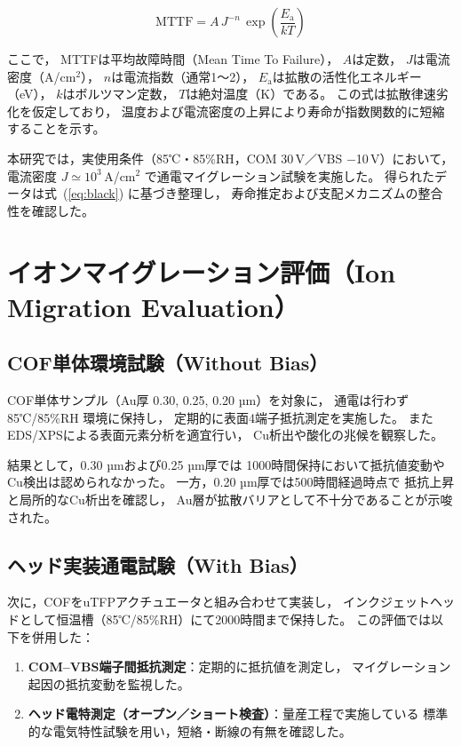 \documentclass[conference]{IEEEtran}
\begin{document}
\begin{equation}
  \mathrm{MTTF} = A \, J^{-n} \, \exp\!\left(\frac{E_\mathrm{a}}{kT}\right)
  \label{eq:black}
\end{equation}

ここで，
MTTFは平均故障時間（Mean Time To Failure），
$A$は定数，
$J$は電流密度（A/cm$^2$），
$n$は電流指数（通常1～2），
$E_\mathrm{a}$は拡散の活性化エネルギー（eV），
$k$はボルツマン定数，
$T$は絶対温度（K）である。
この式は拡散律速劣化を仮定しており，
温度および電流密度の上昇により寿命が指数関数的に短縮することを示す。

本研究では，実使用条件（85℃・85\%RH，COM 30\,V／VBS $-$10\,V）において，
電流密度 $J \simeq 10^3$\,A/cm$^2$ で通電マイグレーション試験を実施した。
得られたデータは式~(\ref{eq:black}) に基づき整理し，
寿命推定および支配メカニズムの整合性を確認した。

\section{イオンマイグレーション評価（Ion Migration Evaluation）}

\subsection{COF単体環境試験（Without Bias）}
COF単体サンプル（Au厚 0.30, 0.25, 0.20 µm）を対象に，
通電は行わず 85℃/85\%RH 環境に保持し，
定期的に表面4端子抵抗測定を実施した。
またEDS/XPSによる表面元素分析を適宜行い，
Cu析出や酸化の兆候を観察した。

結果として，0.30 µmおよび0.25 µm厚では
1000時間保持において抵抗値変動やCu検出は認められなかった。
一方，0.20 µm厚では500時間経過時点で
抵抗上昇と局所的なCu析出を確認し，
Au層が拡散バリアとして不十分であることが示唆された。

\subsection{ヘッド実装通電試験（With Bias）}
次に，COFをuTFPアクチュエータと組み合わせて実装し，
インクジェットヘッドとして恒温槽（85℃/85\%RH）にて2000時間まで保持した。  
この評価では以下を併用した：
\begin{enumerate}
  \item \textbf{COM--VBS端子間抵抗測定}：定期的に抵抗値を測定し，
        マイグレーション起因の抵抗変動を監視した。
  \item \textbf{ヘッド電特測定（オープン／ショート検査）}：量産工程で実施している
        標準的な電気特性試験を用い，短絡・断線の有無を確認した。
\end{enumerate}
\end{document}
